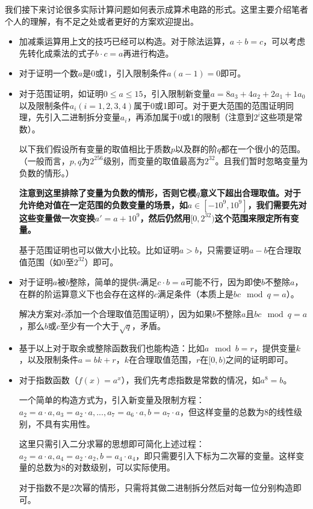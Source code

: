 \documentclass[12pt]{article}
\begin{document}
我们接下来讨论很多实际计算问题如何表示成算术电路的形式。这里主要介绍笔者个人的理解，有不足之处或者更好的方案欢迎提出。
\begin{itemize}
	\item 加减乘运算用上文的技巧已经可以构造。对于除法运算，$a \div b=c$，可以考虑先转化成乘法的式子$b \cdot c=a$再进行构造。
	\item 对于证明一个数$a$是0或1，引入限制条件$a(a-1)=0$即可。
	\item 对于范围证明，如证明$0 \leq a \leq 15$，引入限制新变量$a=8a_3+4a_2+2a_1+1a_0$以及限制条件$a_i(i=1,2,3,4)$属于0或1即可。对于更大范围的范围证明同理，先引入二进制拆分变量$a_i$，再添加属于0或1的限制（注意到$2^i$这些项是常数）。

	以下我们假设所有变量的取值相比于质数$p$以及群的阶$q$都在一个很小的范围。（一般而言，$p,q$为$2^{256}$级别，而变量的取值最高为$2^{32}$。且我们暂时忽略变量为负数的情形。）

	 \textbf{注意到这里排除了变量为负数的情形，否则它模$q$意义下超出合理取值。对于允许绝对值在一定范围的负数变量的场景，如$a\in [-10^9,10^9]$，我们需要先对这些变量做一次变换$a'=a+10^9$，然后仍然用$[0,2^{32})$这个范围来限定所有变量。}

	基于范围证明也可以做大小比较。比如证明$a>b$，只需要证明$a-b$在合理取值范围（如0至$2^{32}$）即可。

	\item 对于证明$a$被$b$整除，简单的提供$c$满足$c\cdot b=a$可能不行，因为即使$b$不整除$a$，在群的阶运算意义下也会存在这样的$c$满足条件（本质上是$bc \mod q=a$）。

	解决方案对$c$添加一个合理取值范围证明），因为如果$b$不整除$a$且$bc \mod q =a$，那么$b$或$c$至少有一个大于$\sqrt{q}$，矛盾。
	\item 基于以上对于取余或整除函数我们也能构造：比如$a \mod b =r$，提供变量$k$，以及限制条件$a=bk+r$，$k$在合理取值范围，$r$在$[0,b)$之间的证明即可。
	\item 对于指数函数（$f(x)=a^x$），我们先考虑指数是常数的情况，如$a^8=b$。

	一个简单的构造方式为，引入新变量及限制方程：$a_2=a\cdot a,a_3=a_2\cdot a,...,a_7=a_6\cdot a,b=a_7\cdot a$，但这样变量的总数为$8$的线性级别，不具有实用性。

	这里只需引入二分求幂的思想即可简化上述过程：$a_2=a\cdot a, a_4=a_2\cdot a_2,b=a_4\cdot a_4$，即只需要引入下标为二次幂的变量。这样变量的总数为$8$的对数级别，可以实际使用。

	对于指数不是2次幂的情形，只需将其做二进制拆分然后对每一位分别构造即可。


\end{itemize}
\end{document}
